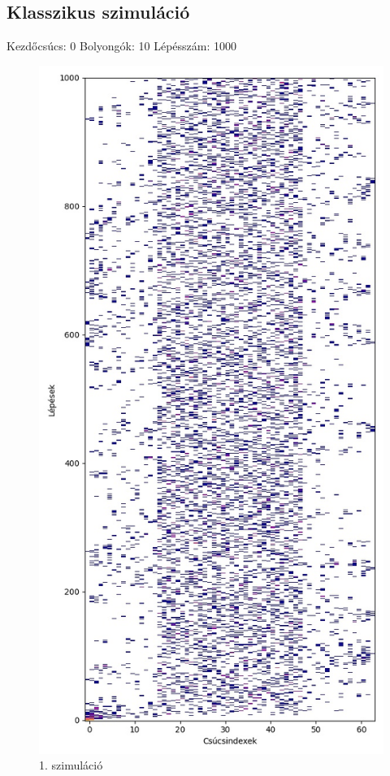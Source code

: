 \documentclass[14pt,a4paper]{article}
\begin{document}
\subsection{Klasszikus szimuláció}
Kezdőcsúcs: 0
Bolyongók: 10
Lépésszám: 1000
\begin{figure}[H]
\centering
\includegraphics[width = 0.7\columnwidth]{sim01.jpg}
\caption{1. szimuláció}
\end{figure}
\end{document}
